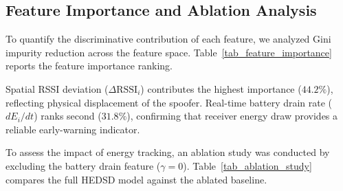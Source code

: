 \documentclass[conference]{IEEEtran}
\begin{document}
\subsection{Feature Importance and Ablation Analysis}
To quantify the discriminative contribution of each feature, we analyzed Gini impurity reduction across the feature space. Table~\ref{tab_feature_importance} reports the feature importance ranking.

\begin{table}[htbp]
\caption{Feature Importance Ranking in Multi-Feature Anomaly Engine}
\label{tab_feature_importance}
\centering
\small
\renewcommand{\arraystretch}{1.15}
\end{table}

Spatial RSSI deviation ($\Delta\text{RSSI}_i$) contributes the highest importance ($44.2\%$), reflecting physical displacement of the spoofer. Real-time battery drain rate ($dE_i/dt$) ranks second ($31.8\%$), confirming that receiver energy draw provides a reliable early-warning indicator.

To assess the impact of energy tracking, an ablation study was conducted by excluding the battery drain feature ($\gamma = 0$). Table~\ref{tab_ablation_study} compares the full HEDSD model against the ablated baseline.

\begin{table}[htbp]
\caption{Ablation Study: Performance With vs. Without Battery Drain Feature}
\label{tab_ablation_study}
\centering
\small
\renewcommand{\arraystretch}{1.15}
\end{table}
\end{document}
